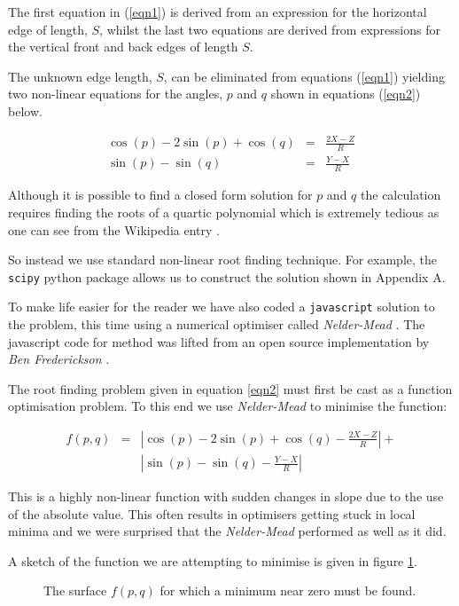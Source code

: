 \documentclass[11pt]{article}
\begin{document}
The first equation in (\ref{eqn1}) is derived from an expression for the horizontal edge of length, $S$,
whilst the last two equations are derived from expressions for the vertical front and back edges of length $S$.

The unknown edge length, $S$, can be eliminated from equations (\ref{eqn1}) 
yielding two non-linear equations for the angles, $p$ and $q$ shown in 
equations (\ref{eqn2}) below.

\begin{eqnarray}
\cos(p) - 2 \sin(p) + \cos(q) & = & \frac{2X-Z}{R} \nonumber \\
\sin(p) - \sin(q) & = & \frac{Y-X}{R}   \label{eqn2} 
\end{eqnarray}

Although it is possible to find a closed form solution for $p$ and $q$ the calculation 
requires finding the roots of a quartic polynomial which is extremely tedious as one
can see from the Wikipedia entry \cite{quartic}.

So instead we use standard non-linear root finding technique. For example,
the {\tt scipy} python package allows us to construct the solution shown in Appendix A.

To make life easier for the reader we have also coded a {\tt javascript} solution to the
problem, this time using a numerical optimiser called {\it Nelder-Mead} \cite{nelder}. 
The javascript code for method was lifted from an open source implementation by 
{\em Ben Frederickson} \cite{benfred}.

The root finding problem given in equation \ref{eqn2} must first be cast as a function
optimisation problem. To this end we use {\em Nelder-Mead} to minimise the function:

\begin{eqnarray}
  f(p,q)  & =  & | \cos(p) - 2 \sin(p) + \cos(q) - \frac{2X-Z}{R} | + \nonumber \\
             &     &  | \sin(p) - \sin(q) - \frac{Y-X}{R} |   \label{eqn3} 
\end{eqnarray}

This is a highly non-linear function with sudden changes in slope due to the use of the
absolute value. This often results in optimisers getting stuck in local minima and
we were surprised that the {\em Nelder-Mead} performed as well as it did.

A sketch of the function we are attempting to minimise is given in figure \ref{fig2}.

\begin{figure}[H]
\begin{center}
\end{center}
\caption{The surface $f(p,q)$ for which a minimum near zero must be found.}  
\label{fig2}
\end{figure}
\end{document}

